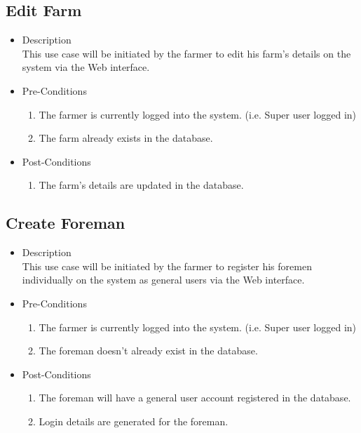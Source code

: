 \documentclass[11pt,fleqn]{book} %
\begin{document}
		\subsection{Edit Farm}
		\begin{itemize}
			\item Description\\
			This use case will be initiated by the farmer to edit his farm’s details on the system via the Web interface.
			\item Pre-Conditions
			\begin{enumerate}
				\item The farmer is currently logged into the system. (i.e. Super user logged in)
				\item The farm already exists in the database.					
			\end{enumerate}
			\item Post-Conditions
			\begin{enumerate}
				\item The farm’s details are updated in the database.
			\end{enumerate}
		\end{itemize}
		
		\subsection{Create Foreman}
		\begin{itemize}
			\item Description\\
			This use case will be initiated by the farmer to register his foremen individually on the system as general users via the Web interface.
			\item Pre-Conditions
			\begin{enumerate}
				\item The farmer is currently logged into the system. (i.e. Super user logged in)
				\item The foreman doesn’t already exist in the database.
			\end{enumerate}
			\item Post-Conditions
			\begin{enumerate}
				\item The foreman will have a general user account registered in the database.
				\item Login details are generated for the foreman.				
			\end{enumerate}
		\end{itemize}
		
\end{document}
